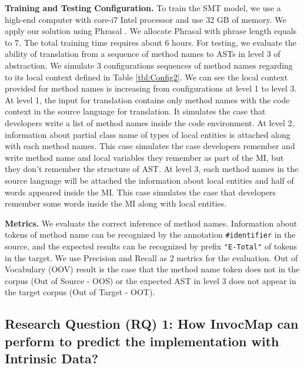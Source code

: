 \textbf{Training and Testing Configuration.} To train the SMT model, we use a high-end computer with core-i7 Intel processor and use 32 GB of memory. We apply our solution using Phrasal \cite{Green2014}. We allocate Phrasal with phrase length equals to 7. The total training time requires about 6 hours. For testing, we evaluate the ability of translation from a sequence of method names to ASTs in level 3 of abstraction. We simulate 3 configurations sequences of method names regarding to its local context defined in Table \ref{tbl:Config2}. We can see the local context provided for method names is increasing from configurations at level 1 to level 3. At level 1, the input for translation contains only method names with the code context in the source language for translation. It simulates the case that developers write a list of method names inside the code environment. At level 2, information about partial class name of types of local entities is attached along with each method names. This case simulates the case developers remember and write method name and local variables they remember as part of the MI, but they don't remember the structure of AST. At level 3, each method names in the source language will be attached the information about local entities and half of words appeared inside the MI. This case simulates the case that developers remember some words inside the MI along with local entities. 


\textbf{Metrics.} We evaluate the correct inference of method names. Information about tokens of method name can be recognized by the annotation \texttt{\#identifier} in the source, and the expected results can be recognized by prefix \texttt{"E-Total"} of tokens in the target. We use Precision and Recall as 2 metrics for the evaluation. Out of Vocabulary (OOV) result is the case that the method name token does not in the corpus (Out of Source - OOS) or the expected AST in level 3 does not appear in the target corpus (Out of Target - OOT). 
 
\subsection{Research Question (RQ) 1: How InvocMap can perform to predict the implementation with Intrinsic Data?}

